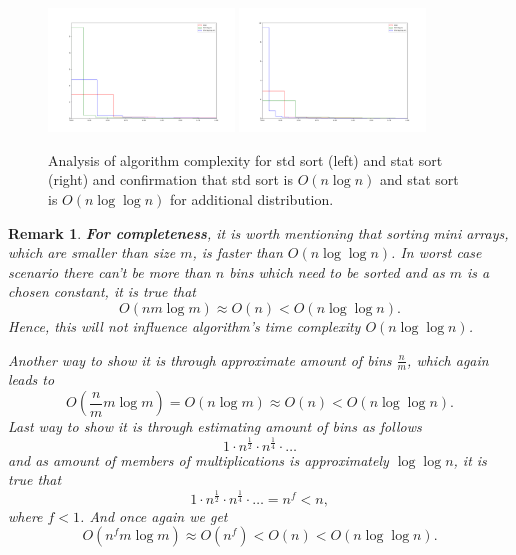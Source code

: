 \documentclass[12pt]{article}
\newtheorem*{remark}{Remark}
\begin{document}
                \begin{figure}
		\begin{center}
			\includegraphics[width=0.44\textwidth]{fig_dist_anal_weird_stdsort.png}
			\includegraphics[width=0.44\textwidth]{fig_dist_anal_weird_statsort.png}
		\end{center}
		\caption{Analysis of algorithm complexity for std sort (left) and stat sort (right) and confirmation that std sort is $O(n \log n)$ and stat sort is $O(n \log \log n)$ for additional distribution.}
		\label{fig7}
		\end{figure}	

    \begin{remark}
        \textbf{For completeness}, it is worth mentioning that sorting mini arrays, which are smaller than size $m$, is faster than $O(n \log \log n)$. In worst case scenario there can't be more than $n$ bins which need to be sorted and as $m$ is a chosen constant, it is true that
        \[
        O(n m \log m) \approx O(n) < O(n \log \log n).
        \]
        Hence, this will not influence algorithm's time complexity $O(n \log \log n)$.
        
        Another way to show it is through approximate amount of bins $\frac{n}{m}$, which again leads to
        \[
        O(\frac{n}{m} m \log m) = O(n \log m) \approx O(n) < O(n \log \log n).
        \]
        Last way to show it is through estimating amount of bins as follows
        \[
    1 \cdot n^{\frac{1}{2}} \cdot n^{\frac{1}{4}} \cdot \ldots
        \]
        and as amount of members of multiplications is approximately $\log \log n$, it is true that
        \[
        1 \cdot n^{\frac{1}{2}} \cdot n^{\frac{1}{4}} \cdot \ldots = n^f < n,
        \]
        where $f<1$. And once again we get
        \[
        O(n^f m \log m) \approx O(n^f) < O(n) < O(n \log \log n).
        \]

    \end{remark}
        
\end{document}
